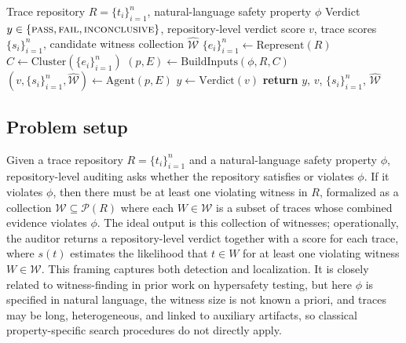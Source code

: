 \documentclass{article} %
\newcommand{\ourmethod}{Meerkat\xspace}
\begin{document}
\begin{algorithm}[t]
\caption{\ourmethod}
\label{alg:meerkat}
\begin{algorithmic}[1]
\REQUIRE Trace repository $R=\{t_i\}_{i=1}^n$, natural-language safety property $\phi$
\ENSURE Verdict $y \in \{\textsc{pass}, \textsc{fail}, \textsc{inconclusive}\}$, repository-level verdict score $v$, trace scores $\{s_i\}_{i=1}^n$, candidate witness collection $\widehat{\mathcal{W}}$
\STATE $\{e_i\}_{i=1}^n \leftarrow \mathrm{Represent}(R)$
\STATE $C \leftarrow \mathrm{Cluster}(\{e_i\}_{i=1}^n)$
\STATE $(p, E) \leftarrow \mathrm{BuildInputs}(\phi, R, C)$ 
\STATE $(v, \{s_i\}_{i=1}^n, \widehat{\mathcal{W}}) \leftarrow \mathrm{Agent}(p, E)$
\STATE $y \leftarrow \mathrm{Verdict}(v)$
\STATE \textbf{return} $y$, $v$, $\{s_i\}_{i=1}^n$, $\widehat{\mathcal{W}}$
\end{algorithmic}
\end{algorithm}

\subsection{Problem setup}
Given a trace repository $R=\{t_i\}_{i=1}^n$ and a natural-language safety property $\phi$, repository-level auditing asks whether the repository satisfies or violates $\phi$. If it violates $\phi$, then there must be at least one violating witness in $R$, formalized as a collection $\mathcal{W} \subseteq \mathcal{P}(R)$ where each $W \in \mathcal{W}$ is a subset of traces whose combined evidence violates $\phi$.
The ideal output is this collection of witnesses; operationally, the auditor returns a repository-level verdict together with a score for each trace, where $s(t)$ estimates the likelihood that $t \in W$ for at least one violating witness $W \in \mathcal{W}$.
This framing captures both detection and localization.
It is closely related to witness-finding in prior work on hypersafety testing, but here $\phi$ is specified in natural language, the witness size is not known a priori, and traces may be long, heterogeneous, and linked to auxiliary artifacts, so classical property-specific search procedures do not directly apply.
\end{document}
